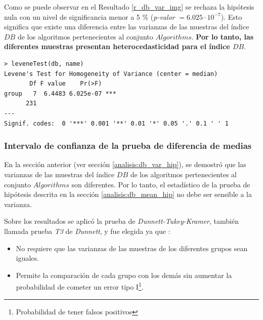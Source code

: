     Como se puede observar en el Resultado \ref{r_db_var_img} se rechaza la hipótesis
nula con un nivel de significancia menor a 5 \% (\emph{p-valor} $ = 6.025 \cdot 10^{-7}$).
Esto significa que existe una diferencia entre las varianzas de las muestras
del índice $DB$ de los algoritmos pertenecientes al conjunto $Algorithms$.
\textbf{Por lo tanto, las diferentes muestras presentan heterocedasticidad para
el índice $DB$}.

\begin{lstlisting}[float=h!, caption={Diferencia de Varianza: Índice \emph{DB}}, label=r_db_var_img]
> leveneTest(db, name)
Levene's Test for Homogeneity of Variance (center = median)
       Df F value    Pr(>F)    
group   7  6.4483 6.025e-07 ***
      231                      
---
Signif. codes:  0 '***' 0.001 '**' 0.01 '*' 0.05 '.' 0.1 ' ' 1 
\end{lstlisting}

\subsubsection{Intervalo de confianza de la prueba de diferencia de medias}\label{analisis:db_mean_est}

    En la sección anterior (ver sección \ref{analisis:db_var_hip}), se demostró
que las varianzas de las muestras del índice $DB$ de los algoritmos pertenecientes
al conjunto $Algorithms$ son diferentes. Por lo tanto, el estadístico de la prueba
de hipótesis descrita en la sección \ref{analisis:db_mean_hip} no debe ser
sensible a la varianza.

    Sobre los resultados se aplicó la prueba de \emph{Dunnett-Tukey-Kramer},
también llamada prueba \emph{T3} de \emph{Dunnett}, y fue elegida ya que
\cite{DTK_Test}:
\begin{itemize}
    \item No requiere que las varianzas de las muestras de los diferentes grupos
sean iguales.
    \item Permite la comparación de cada grupo con los demás sin aumentar la
probabilidad de cometer un error tipo I\footnote{Probabilidad de tener falsos
positivos}.
\end{itemize}

